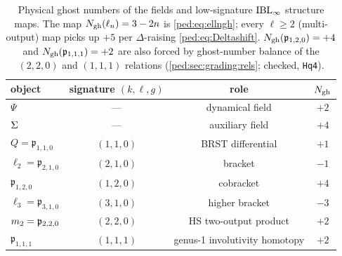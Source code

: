 \begin{table}[htp]
	\centering
	\begin{tabular}{lccc}
		\toprule
		object & signature $(k,\ell,g)$ & role & $N_{\text{gh}}$ \\
		\midrule
		$\Psi$ & --- & dynamical field & $+2$ \\
		$\Sigma$ & --- & auxiliary field & $+4$ \\
		$Q=\mathfrak p_{1,1,0}$ & $(1,1,0)$ & BRST differential & $+1$ \\
		$\ell_2=\mathfrak p_{2,1,0}$ & $(2,1,0)$ & bracket & $-1$ \\
		$\mathfrak p_{1,2,0}$ & $(1,2,0)$ & cobracket & $+4$ \\
		$\ell_3=\mathfrak p_{3,1,0}$ & $(3,1,0)$ & higher bracket & $-3$ \\
		$m_2=\mathfrak p_{2,2,0}$ & $(2,2,0)$ & HS two-output product & $+2$ \\
		$\mathfrak p_{1,1,1}$ & $(1,1,1)$ & genus-1 involutivity homotopy & $+2$ \\
		\bottomrule
	\end{tabular}
	\caption{Physical ghost numbers of the fields and low-signature $\mathrm{IBL}_\infty$ structure maps.
		The map $N_{\text{gh}}(\ell_n)=3-2n$ is \eqref{ped:eq:ellngh}; every $\ell\ge2$ (multi-output)
		map picks up $+5$ per $\Delta$-raising \eqref{ped:eq:Deltashift}.
		$N_{\text{gh}}(\mathfrak p_{1,2,0})=+4$ and $N_{\text{gh}}(\mathfrak p_{1,1,1})=+2$ are also forced by
		ghost-number balance of the $(2,2,0)$ and $(1,1,1)$ relations
		(\cref{ped:sec:grading:rels}; checked, \texttt{Hq4}).}
	\label{ped:tab:ngh}
\end{table}

